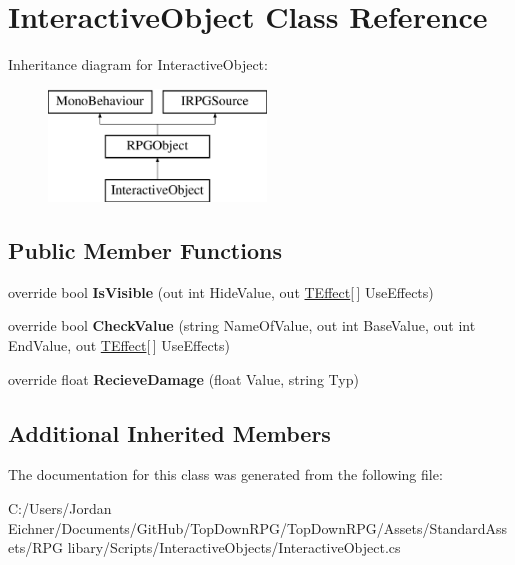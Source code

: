 \hypertarget{class_interactive_object}{}\section{Interactive\+Object Class Reference}
\label{class_interactive_object}
Inheritance diagram for Interactive\+Object\+:\begin{figure}[H]
\begin{center}
\leavevmode
\includegraphics[height=3.000000cm]{class_interactive_object}
\end{center}
\end{figure}
\subsection*{Public Member Functions}
\begin{DoxyCompactItemize}
\item 
\hypertarget{class_interactive_object_abddd2865d50c231e21c2729c26d6466c}{}override bool {\bfseries Is\+Visible} (out int Hide\+Value, out \hyperlink{class_t_effect}{T\+Effect}\mbox{[}$\,$\mbox{]} Use\+Effects)\label{class_interactive_object_abddd2865d50c231e21c2729c26d6466c}

\item 
\hypertarget{class_interactive_object_a28ab335d2f20a2787a6ca2d91511552d}{}override bool {\bfseries Check\+Value} (string Name\+Of\+Value, out int Base\+Value, out int End\+Value, out \hyperlink{class_t_effect}{T\+Effect}\mbox{[}$\,$\mbox{]} Use\+Effects)\label{class_interactive_object_a28ab335d2f20a2787a6ca2d91511552d}

\item 
\hypertarget{class_interactive_object_af7977dcb81d6bc5a8714e5ade8013ae8}{}override float {\bfseries Recieve\+Damage} (float Value, string Typ)\label{class_interactive_object_af7977dcb81d6bc5a8714e5ade8013ae8}

\end{DoxyCompactItemize}
\subsection*{Additional Inherited Members}


The documentation for this class was generated from the following file\+:\begin{DoxyCompactItemize}
\item 
C\+:/\+Users/\+Jordan Eichner/\+Documents/\+Git\+Hub/\+Top\+Down\+R\+P\+G/\+Top\+Down\+R\+P\+G/\+Assets/\+Standard\+Assets/\+R\+P\+G libary/\+Scripts/\+Interactive\+Objects/Interactive\+Object.\+cs\end{DoxyCompactItemize}
